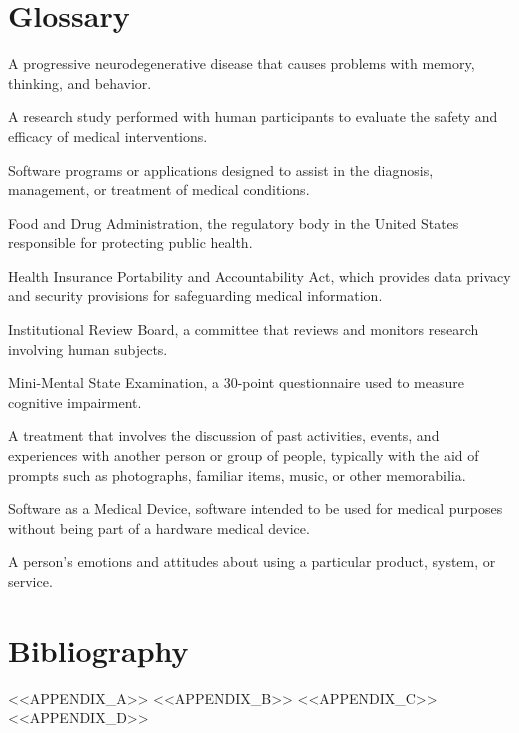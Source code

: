\documentclass[12pt,a4paper]{book}
\begin{document}
\chapter{Glossary}
\begin{description}[style=nextline]
\item[Alzheimer's Disease (AD)] A progressive neurodegenerative disease that causes problems with memory, thinking, and behavior.
\item[Clinical Trial] A research study performed with human participants to evaluate the safety and efficacy of medical interventions.
\item[Digital Health Application] Software programs or applications designed to assist in the diagnosis, management, or treatment of medical conditions.
\item[FDA] Food and Drug Administration, the regulatory body in the United States responsible for protecting public health.
\item[HIPAA] Health Insurance Portability and Accountability Act, which provides data privacy and security provisions for safeguarding medical information.
\item[IRB] Institutional Review Board, a committee that reviews and monitors research involving human subjects.
\item[MMSE] Mini-Mental State Examination, a 30-point questionnaire used to measure cognitive impairment.
\item[Reminiscence Therapy] A treatment that involves the discussion of past activities, events, and experiences with another person or group of people, typically with the aid of prompts such as photographs, familiar items, music, or other memorabilia.
\item[SaMD] Software as a Medical Device, software intended to be used for medical purposes without being part of a hardware medical device.
\item[User Experience (UX)] A person's emotions and attitudes about using a particular product, system, or service.
\end{description}
\chapter{Bibliography}
\printbibliography[heading=none]
\begin{appendices}
<<APPENDIX_A>>
<<APPENDIX_B>>
<<APPENDIX_C>>
<<APPENDIX_D>>
\end{appendices}
\end{document}
